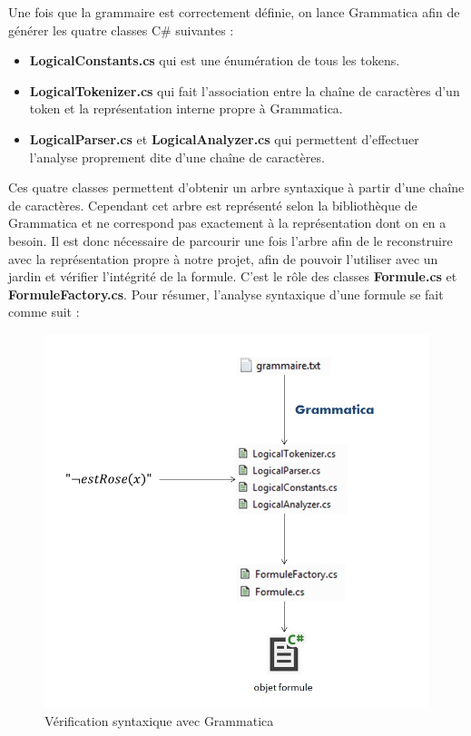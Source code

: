 Une fois que la grammaire est correctement définie, on lance Grammatica afin de générer les quatre classes C\# suivantes :
\begin{itemize}
	\item \textbf{LogicalConstants.cs} qui est une énumération de tous les tokens.
	\item \textbf{LogicalTokenizer.cs} qui fait l'association entre la chaîne de caractères d'un token et la représentation interne propre à Grammatica.
	\item \textbf{LogicalParser.cs} et \textbf{LogicalAnalyzer.cs} qui permettent d'effectuer l'analyse proprement dite d'une chaîne de caractères.
\end{itemize}
Ces quatre classes permettent d'obtenir un arbre syntaxique à partir d'une chaîne de caractères. Cependant cet arbre est représenté selon la bibliothèque de Grammatica et ne correspond pas exactement à la représentation dont on en a besoin. Il est donc nécessaire de parcourir une fois l'arbre afin de le reconstruire avec la représentation propre à notre projet, afin de pouvoir l'utiliser avec un jardin et vérifier l'intégrité de la formule. C'est le rôle des classes \textbf{Formule.cs} et \textbf{FormuleFactory.cs}. Pour résumer, l'analyse syntaxique d'une formule se fait comme suit :

\begin{center}
\begin{figure}[!h]
\includegraphics[scale=0.5]{choix_techniques/analyse_syntaxique.jpg}
\caption{Vérification syntaxique avec Grammatica}
\end{figure}
\end{center}
\clearpage

